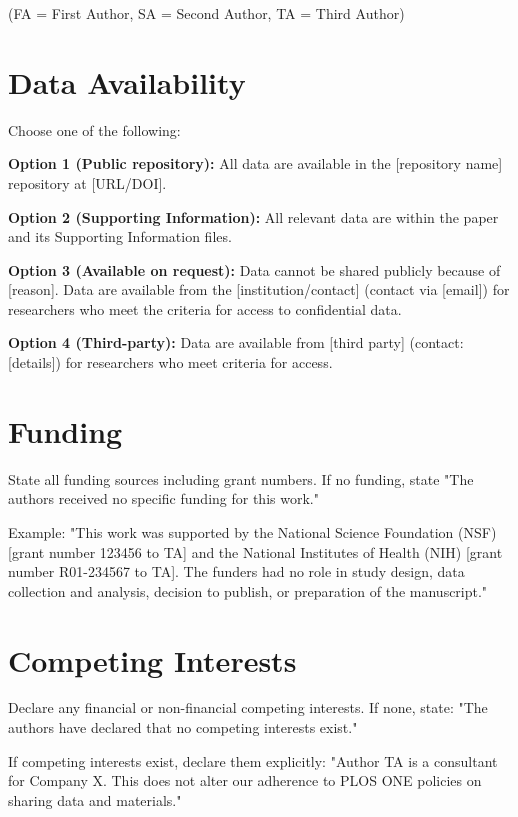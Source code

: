 \documentclass[10pt,letterpaper]{article}
\begin{document}
(FA = First Author, SA = Second Author, TA = Third Author)

\section*{Data Availability}

Choose one of the following:

\textbf{Option 1 (Public repository):}
All data are available in the [repository name] repository at [URL/DOI].

\textbf{Option 2 (Supporting Information):}
All relevant data are within the paper and its Supporting Information files.

\textbf{Option 3 (Available on request):}
Data cannot be shared publicly because of [reason]. Data are available from the [institution/contact] (contact via [email]) for researchers who meet the criteria for access to confidential data.

\textbf{Option 4 (Third-party):}
Data are available from [third party] (contact: [details]) for researchers who meet criteria for access.

\section*{Funding}

State all funding sources including grant numbers. If no funding, state "The authors received no specific funding for this work."

Example: "This work was supported by the National Science Foundation (NSF) [grant number 123456 to TA] and the National Institutes of Health (NIH) [grant number R01-234567 to TA]. The funders had no role in study design, data collection and analysis, decision to publish, or preparation of the manuscript."

\section*{Competing Interests}

Declare any financial or non-financial competing interests. If none, state: "The authors have declared that no competing interests exist."

If competing interests exist, declare them explicitly: "Author TA is a consultant for Company X. This does not alter our adherence to PLOS ONE policies on sharing data and materials."
\end{document}
